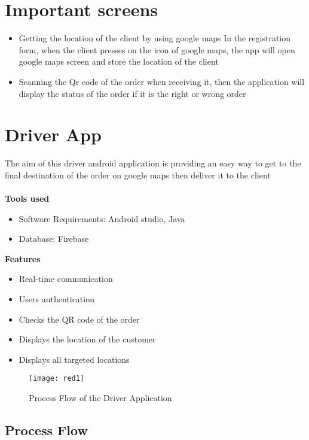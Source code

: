\section{Important screens}
\begin{itemize}
    \item Getting the location of the client by using google maps
    In the registration form, when the client presses on the icon of google maps, the app will open
    google maps screen and store the location of the client
    \item Scanning the Qr code of the order when receiving it, then the application will display the
    status of the order if it is the right or wrong order
\end{itemize}

\section{Driver App}

The aim of this driver android application is providing an easy way to get to the final destination of
the order on google maps then deliver it to the client\\\\

\textbf{Tools used}
\begin{itemize}
    \item Software Requirements: Android studio, Java
    \item Database: Firebase
\end{itemize}

\textbf{Features}
\begin{itemize}
    \item Real-time communication
    \item Users authentication
    \item Checks the QR code of the order
    \item Displays the location of the customer
    \item Displays all targeted locations
\end{itemize}


\begin{figure}[h]
    \texttt{[image: red1]}
    \centering
    \caption{Process Flow of the Driver Application}
    \label{fig:red1}
\end{figure}

\subsection{Process Flow}


